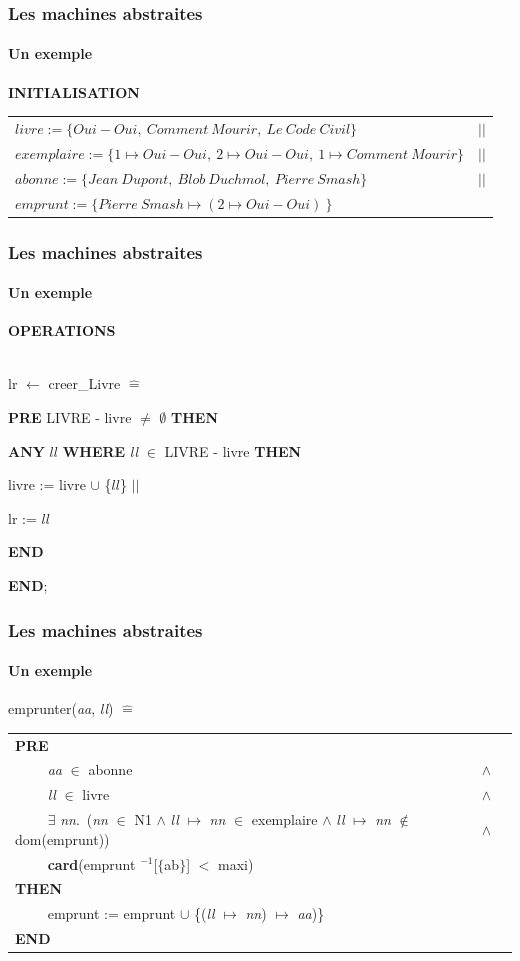 \documentclass[11pt,a4paper,xcolor=table, handout]{beamer} %
\newcommand{\Bequal}{\mathrel{\widehat{=}}}
\begin{document}
\begin{frame}
\frametitle{Les machines abstraites}
\framesubtitle{Un exemple}
\noindent\textbf{INITIALISATION}
\begin{longtable}{ll}
$livre := \{Oui-Oui,\ Comment\ Mourir,\ Le\ Code\ Civil\} $& $||$ \tabularnewline
$exemplaire := \{1 \mapsto Oui-Oui,\ 2 \mapsto Oui-Oui,\ 1 \mapsto Comment\ Mourir\}$ & $||$ \tabularnewline
$abonne := \{Jean\ Dupont,\ Blob\ Duchmol,\ Pierre\ Smash\} $& $||$ \tabularnewline
$emprunt := \{Pierre\ Smash \mapsto ( 2 \mapsto Oui-Oui)\ \}$ &
\end{longtable}
\end{frame}

\begin{frame}
\frametitle{Les machines abstraites}
\framesubtitle{Un exemple}
\noindent \textbf{OPERATIONS}

~\\
\indent lr $\leftarrow$ creer\_Livre $\Bequal$

\textbf{PRE} LIVRE - livre $\neq$ $\emptyset$ \textbf{THEN}

\hspace*{1em} \textbf{ANY} $ll$ \textbf{WHERE}  \emph{ll} $\in$ LIVRE - livre \textbf{THEN} 

\hspace*{2em}  livre := livre $\cup$ \{$ll$\} $||$ 

\hspace*{2em} lr := $ll$

\hspace*{1em} \textbf{END}

\textbf{END};

\end{frame}

\begin{frame}
\frametitle{Les machines abstraites}
\framesubtitle{Un exemple}
\indent emprunter(\emph{aa}, \emph{ll}) $\Bequal$
\begin{longtable}{lll}
\textbf{PRE} \tabularnewline
~~~~ \emph{aa} $\in$ abonne & $\wedge$ \tabularnewline 
~~~~ \emph{ll} $\in$ livre & $\wedge$ \tabularnewline
~~~~ $\exists$ \emph{nn}.\ (\emph{nn} $\in$ N1 $\wedge$ \emph{ll} $\mapsto$ \emph{nn} $\in$ exemplaire $\wedge$ \emph{ll} $\mapsto$ \emph{nn} $\notin$ dom(emprunt)) & $\wedge$ \tabularnewline
~~~~ \textbf{card}(emprunt $^{-1}$[$\{$ab$\}$] $<$ maxi) \tabularnewline
\textbf{THEN} \tabularnewline ~~~~ emprunt := emprunt $\cup$ \{(\emph{ll} $\mapsto$ \emph{nn}) $\mapsto$ \emph{aa})\} \tabularnewline
\textbf{END} \tabularnewline
\end{longtable}
\end{frame}
\end{document}
